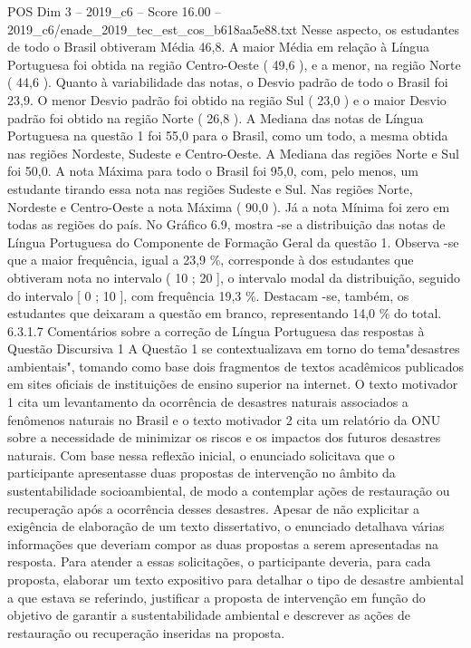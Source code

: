 \begin{textsample}{POS Dim 3 – 2019\_c6 – Score 16.00 – 2019\_c6/enade\_2019\_tec\_est\_cos\_b618aa5e88.txt}
Nesse aspecto, os estudantes de todo o Brasil obtiveram Média 46,8.
A maior Média em relação à Língua Portuguesa foi obtida na região Centro-Oeste ( 49,6 ), e a menor, na região Norte ( 44,6 ).
Quanto à variabilidade das notas, o Desvio padrão de todo o Brasil foi 23,9.
O menor Desvio padrão foi obtido na região Sul ( 23,0 ) e o maior Desvio padrão foi obtido na região Norte ( 26,8 ).
A Mediana das notas de Língua Portuguesa na questão 1 foi 55,0 para o Brasil, como um todo, a mesma obtida nas regiões Nordeste, Sudeste e Centro-Oeste.
A Mediana das regiões Norte e Sul foi 50,0.
A nota Máxima para todo o Brasil foi 95,0, com, pelo menos, um estudante tirando essa nota nas regiões Sudeste e Sul.
Nas regiões Norte, Nordeste e Centro-Oeste a nota Máxima ( 90,0 ).
Já a nota Mínima foi zero em todas as regiões do país.
No Gráfico 6.9, mostra -se a distribuição das notas de Língua Portuguesa do Componente de Formação Geral da questão 1.
Observa -se que a maior frequência, igual a 23,9 \%, corresponde à dos estudantes que obtiveram nota no intervalo ( 10 ; 20 ], o intervalo modal da distribuição, seguido do intervalo [ 0 ; 10 ], com frequência 19,3 \%.
Destacam -se, também, os estudantes que deixaram a questão em branco, representando 14,0 \% do total. 6.3.1.7 Comentários sobre a correção de Língua Portuguesa das respostas à Questão Discursiva 1 A Questão 1 se contextualizava em torno do tema"desastres ambientais", tomando como base dois fragmentos de textos acadêmicos publicados em sites oficiais de instituições de ensino superior na internet.
O texto motivador 1 cita um levantamento da ocorrência de desastres naturais associados a fenômenos naturais no Brasil e o texto motivador 2 cita um relatório da ONU sobre a necessidade de minimizar os riscos e os impactos dos futuros desastres naturais.
Com base nessa reflexão inicial, o enunciado solicitava que o participante apresentasse duas propostas de intervenção no âmbito da sustentabilidade socioambiental, de modo a contemplar ações de restauração ou recuperação após a ocorrência desses desastres.
Apesar de não explicitar a exigência de elaboração de um texto dissertativo, o enunciado detalhava várias informações que deveriam compor as duas propostas a serem apresentadas na resposta.
Para atender a essas solicitações, o participante deveria, para cada proposta, elaborar um texto expositivo para detalhar o tipo de desastre ambiental a que estava se referindo, justificar a proposta de intervenção em função do objetivo de garantir a sustentabilidade ambiental e descrever as ações de restauração ou recuperação inseridas na proposta.

\end{textsample}
